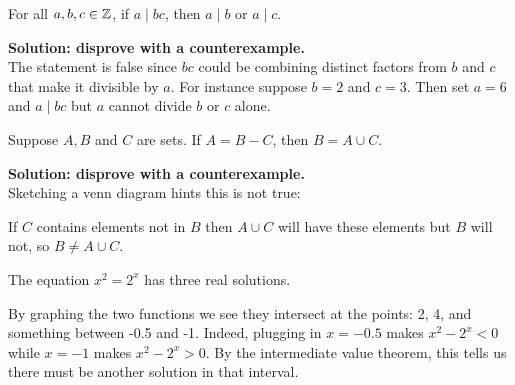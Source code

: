 \documentclass{article}
\begin{document}
\begin{problem}
For all $a, b, c \in \mathbb{Z}$, if $a \mid bc$, then $a \mid b$ or $a \mid c$.\
\end{problem}

\textbf{Solution: disprove with a counterexample.}
\\

The statement is false since $bc$ could be combining distinct factors from $b$ and $c$ that make it divisible by $a$. For instance suppose $b = 2$ and $c = 3$. Then set $a = 6$ and $a \mid bc$ but $a$ cannot divide $b$ or $c$ alone.

\begin{problem}
Suppose $A, B$ and $C$ are sets. If $A = B - C$, then $B = A \cup C$.
\end{problem}

\textbf{Solution: disprove with a counterexample.}
\\

Sketching a venn diagram hints this is not true:


\begin{center}
\end{center}

If $C$ contains elements not in $B$ then $A \cup C$ will have these elements but $B$ will not, so $B \neq A \cup C$.

\begin{problem}
The equation $x^2 = 2^x$ has three real solutions.
\end{problem}

By graphing the two functions we see they intersect at the points: 2, 4, and something between -0.5 and -1. Indeed, plugging in $x = -0.5$ makes $x^2 - 2^x < 0$ while $x = -1$ makes $x^2 - 2^x > 0$. By the intermediate value theorem, this tells us there must be another solution in that interval.
\end{document}
